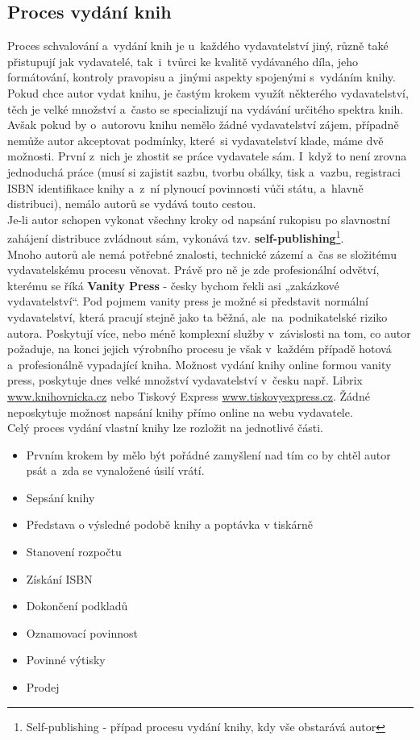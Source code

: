 \documentclass[a4paper,12pt,twoside,BCOR=10mm]{article}
\renewcommand{\b}[1]{\textbf{#1}} %
\begin{document}
\subsection{Proces vydání knih}\label{sec:schvalovani}
Proces schvalování a~vydání knih je u~každého vydavatelství jiný, různě také přistupují jak vydavatelé, tak~i~tvůrci ke kvalitě vydávaného díla, jeho formátování, kontroly pravopisu a~jinými aspekty spojenými s~vydáním knihy.\\
Pokud chce autor vydat knihu, je častým krokem využít některého vydavatelství, těch je velké množství a~často se specializují na vydávání určitého spektra knih. Avšak pokud by o~autorovu knihu nemělo žádné vydavatelství zájem, případně nemůže autor akceptovat podmínky, které~si vydavatelství klade, máme dvě možnosti. První z~nich je zhostit se práce vydavatele sám. I~když to není zrovna jednoduchá práce (musí si zajistit sazbu, tvorbu obálky, tisk a~vazbu, registraci ISBN identifikace knihy a~z~ní plynoucí povinnosti vůči státu, a~hlavně distribuci), nemálo autorů se vydává touto cestou.\cite{lupainternet}\\
Je-li autor schopen vykonat všechny kroky od napsání rukopisu po slavnostní zahájení distribuce zvládnout sám, vykonává tzv. \b{self-publishing}\footnote{Self-publishing - případ procesu vydání knihy, kdy vše obstarává autor}.\\
Mnoho autorů ale nemá potřebné znalosti, technické zázemí a~čas se složitému vydavatelskému procesu věnovat. Právě pro ně je zde profesionální odvětví, kterému se říká \b{Vanity Press} - česky bychom řekli asi „zakázkové vydavatelství“\cite{lupainternet}.
Pod pojmem vanity press je možné si představit normální vydavatelství, která pracují stejně jako ta běžná, ale~na~podnikatelské riziko autora. Poskytují více, nebo méně komplexní služby v~závislosti na tom, co autor požaduje, na konci jejich výrobního procesu je však v~každém případě hotová a~profesionálně vypadající kniha.\cite{lupainternet}
Možnost vydání knihy online formou vanity press, poskytuje dnes velké množství vydavatelství v~česku např. Librix \href{www.knihovnicka.cz}{www.knihovnicka.cz} nebo Tiskový Express \href{www.tiskovyexpress.cz}{www.tiskovyexpress.cz}. Žádné neposkytuje možnost napsání knihy přímo online na webu vydavatele.\\
Celý proces vydání vlastní knihy lze rozložit na jednotlivé části.\cite{jakvydatknihu}
\begin{itemize}
\item Prvním krokem by mělo být pořádné zamyšlení nad tím co by chtěl autor psát a~zda se vynaložené úsilí vrátí.
\item Sepsání knihy
\item Představa o výsledné podobě knihy a poptávka v tiskárně
\item Stanovení rozpočtu
\item Získání ISBN
\item Dokončení podkladů
\item Oznamovací povinnost
\item Povinné výtisky
\item Prodej
\end{itemize}
\end{document}
